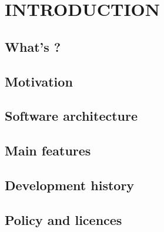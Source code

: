 \chapter{INTRODUCTION}
\section{What's {\iqist}?}
\section{Motivation}
\section{Software architecture}
\section{Main features}
\section{Development history}
\section{Policy and licences}
